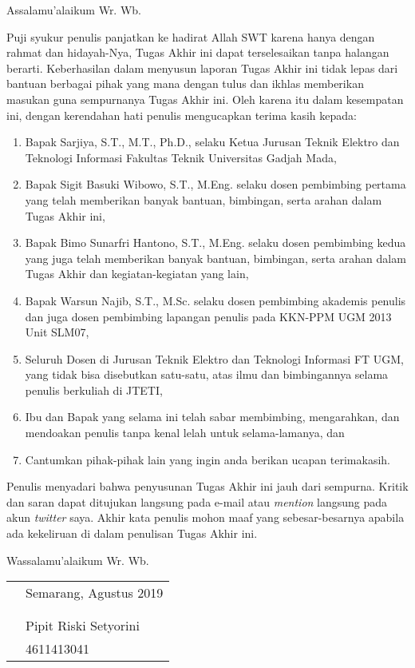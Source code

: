 \preface
Assalamu'alaikum Wr. Wb.

\vspace{0.5cm}

Puji syukur penulis panjatkan ke hadirat Allah SWT karena hanya dengan rahmat dan hidayah-Nya, Tugas Akhir ini dapat terselesaikan tanpa halangan berarti. Keberhasilan dalam menyusun laporan Tugas Akhir ini tidak lepas dari bantuan berbagai pihak yang mana dengan tulus dan ikhlas memberikan masukan guna sempurnanya Tugas Akhir ini. Oleh karena itu dalam kesempatan ini, dengan kerendahan hati penulis mengucapkan terima kasih kepada:

\begin{enumerate}
\item{Bapak Sarjiya, S.T., M.T., Ph.D., selaku Ketua Jurusan Teknik Elektro dan Teknologi Informasi Fakultas Teknik Universitas Gadjah Mada,}
\item{Bapak Sigit Basuki Wibowo, S.T., M.Eng. selaku dosen pembimbing pertama yang telah memberikan banyak bantuan, bimbingan, serta arahan dalam Tugas Akhir ini,}
\item{Bapak Bimo Sunarfri Hantono, S.T., M.Eng. selaku dosen pembimbing kedua yang juga telah memberikan banyak bantuan, bimbingan, serta arahan dalam Tugas Akhir dan kegiatan-kegiatan yang lain,}
\item{Bapak Warsun Najib, S.T., M.Sc. selaku dosen pembimbing akademis penulis dan juga dosen pembimbing lapangan penulis pada KKN-PPM UGM 2013 Unit SLM07,}
\item{Seluruh Dosen di Jurusan Teknik Elektro dan Teknologi Informasi FT UGM, yang tidak bisa disebutkan satu-satu, atas ilmu dan bimbingannya selama penulis berkuliah di JTETI,}
\item{Ibu dan Bapak yang selama ini telah sabar membimbing, mengarahkan, dan mendoakan penulis tanpa kenal lelah untuk selama-lamanya, dan}
\item{Cantumkan pihak-pihak lain yang ingin anda berikan ucapan terimakasih.}
\end{enumerate}

Penulis menyadari bahwa penyusunan Tugas Akhir ini jauh dari sempurna. Kritik dan saran dapat ditujukan langsung pada e-mail atau \emph{mention} langsung pada akun \emph{twitter} saya. Akhir kata penulis mohon maaf yang sebesar-besarnya apabila ada kekeliruan di dalam penulisan Tugas Akhir ini.

\vspace{0.5cm}

Wassalamu'alaikum Wr. Wb.

\begin{tabular}{p{7.5cm} l}
& Semarang, Agustus 2019 \\
&\\
&\\
&Pipit Riski Setyorini \\
&4611413041
\end{tabular}